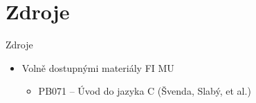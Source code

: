 \section*{Zdroje}
\frame{\sectionpage}

\begin{frame}{Zdroje}

  \begin{itemize}
    \item Volně dostupnými materiály FI MU
    \begin{itemize}
      \item PB071 -- Úvod do jazyka C (Švenda, Slabý, et al.)
    \end{itemize}
  \end{itemize}

\end{frame}


